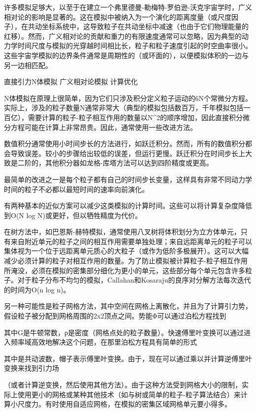 许多模拟足够大，以至于在建立一个弗里德曼-勒梅特-罗伯逊-沃克宇宙学时，广义相对论的影响是显著的。这在模拟中被纳入为一个演化的距离度量（或尺度因子），在共动坐标系统中，这导致粒子在共动坐标中减速（也由于它们物理能量的红移）。然而，广义相对论的贡献和重力的有限速度通常可以忽略，因为典型的动力学时间尺度与模拟的光穿越时间相比长，粒子和粒子速度引起的时空曲率很小。这些宇宙学模拟的边界条件通常是周期性的（或环面的），以便模拟体积的一边与另一边相匹配。

直接引力N体模拟
广义相对论模拟
计算优化

N体模拟在原理上很简单，因为它们只涉及积分定义粒子运动的6N个常微分方程。实际上，涉及的粒子数量N通常非常大（典型的模拟包括数百万，千年模拟包括一百亿），需要计算的粒子-粒子相互作用的数量以N^2的顺序增加，因此直接积分微分方程可能在计算上非常昂贵。因此，通常使用一些改进方法。

数值积分通常使用小时间步长的方法进行，如跃迁积分。然而，所有的数值积分都会导致误差。较小的步骤给出较低的误差，但运行更慢。跃迁积分在时间步长上大致是二阶的，其他积分器如龙格-库塔方法可以达到四阶精度或更高。

最简单的改进之一是每个粒子都有自己的时间步长变量，这样具有非常不同动力学时间的粒子不必都以最短时间的速率向前演化。

有两种基本的近似方案可以减少这类模拟的计算时间。这些可以将计算复杂度降低到O(N log N)或更好，但以牺牲精度为代价。

在树方法中，如巴恩斯-赫特模拟，通常使用八叉树将体积划分为立方体单元，只有来自附近单元的粒子之间的相互作用需要单独处理；来自远距离单元的粒子可以集体视为一个位于远距离单元质心的大粒子（或作为低阶多极展开）。这可以大幅减少必须计算的粒子对相互作用的数量。为了防止模拟被计算粒子-粒子相互作用所淹没，必须在模拟的密集部分细化为更小的单元，这些部分每个单元包含许多粒子。对于粒子分布不均匀的模拟，Callahan和Kosaraju的良序对分解方法每次迭代的时间为O(n log n)。

另一种可能性是粒子网格方法，其中空间在网格上离散化，并且为了计算引力势，假设粒子被分配到网格周围的2x2顶点之间。势能Φ可以通过泊松方程找到

其中G是牛顿常数，ρ是密度（网格点处的粒子数量）。快速傅里叶变换可以通过进入频率域高效地解决这个问题，在那里泊松方程具有简单的形式

其中是共动波数，帽子表示傅里叶变换。由于，现在可以通过乘以并计算逆傅里叶变换来找到引力场

（或者计算逆变换，然后使用其他方法）。由于这种方法受到网格大小的限制，实际上使用更小的网格或某种其他技术（如与树或简单的粒子-粒子算法结合）来计算小尺度力。有时使用自适应网格，在模拟的密集区域网格单元要小得多。

